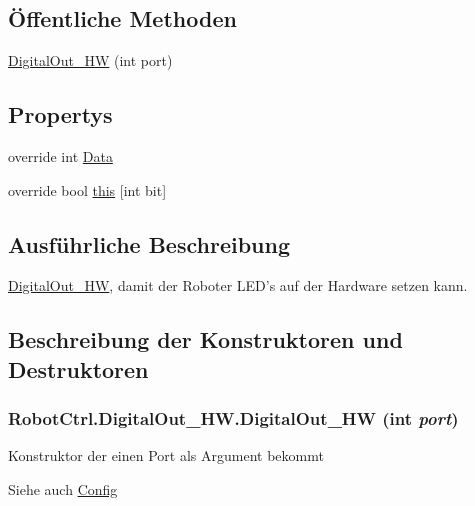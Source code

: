 \subsection*{Öffentliche Methoden}
\begin{DoxyCompactItemize}
\item 
\hyperlink{class_robot_ctrl_1_1_digital_out___h_w_ae26dd8f2e439fa83f3afb1c8fad3e266}{DigitalOut\_\-HW} (int port)
\end{DoxyCompactItemize}
\subsection*{Propertys}
\begin{DoxyCompactItemize}
\item 
override int \hyperlink{class_robot_ctrl_1_1_digital_out___h_w_ae374c259f09079b63f2bb6533e6ce5de}{Data}
\item 
override bool \hyperlink{class_robot_ctrl_1_1_digital_out___h_w_a76f77544e88287efb3b2f273429b2ff0}{this} \mbox{[}int bit\mbox{]}
\end{DoxyCompactItemize}


\subsection{Ausführliche Beschreibung}
\hyperlink{class_robot_ctrl_1_1_digital_out___h_w}{DigitalOut\_\-HW}, damit der Roboter LED's auf der Hardware setzen kann. 

\subsection{Beschreibung der Konstruktoren und Destruktoren}
\hypertarget{class_robot_ctrl_1_1_digital_out___h_w_ae26dd8f2e439fa83f3afb1c8fad3e266}{
\subsubsection[{DigitalOut\_\-HW}]{\setlength{\rightskip}{0pt plus 5cm}RobotCtrl.DigitalOut\_\-HW.DigitalOut\_\-HW (int {\em port})}}
\label{class_robot_ctrl_1_1_digital_out___h_w_ae26dd8f2e439fa83f3afb1c8fad3e266}
Konstruktor der einen Port als Argument bekommt \begin{DoxySeeAlso}{Siehe auch}
\hyperlink{class_robot_ctrl_1_1_config}{Config}
\end{DoxySeeAlso}

